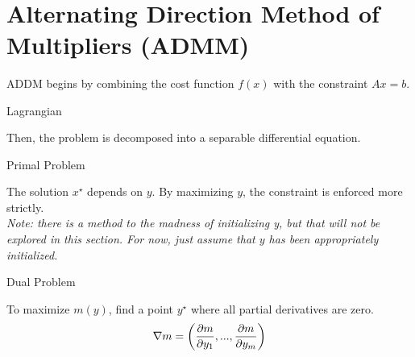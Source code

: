 \documentclass{article}
\begin{document}
\vpush
{}
\\
\section{Alternating Direction Method of Multipliers (ADMM)}
ADDM begins by combining the cost function $f(x)$ with the constraint $Ax=b$.
\begin{headered_box}{Lagrangian}
\end{headered_box}
Then, the problem is decomposed into a separable differential equation.
\begin{headered_box}{Primal Problem}
\end{headered_box}
\begin{flushleft}
  The solution $x^\star$ depends on $y$.  By maximizing $y$, the constraint is enforced more strictly.
  \\
  \vspace{3mm}
  \textit{Note: there is a method to the madness of initializing y, but that will
    not be explored in this section.  For now, just assume that $y$ has been
    appropriately initialized.}
\end{flushleft}

\begin{headered_box}{Dual Problem}
\end{headered_box}
To maximize $m(y)$, find a point $y^\star$ where all partial derivatives are zero.
\begin{align}
  \nabla m=\left({\partial m\over \partial y_1},...,{\partial m\over \partial y_m}\right)
\end{align}
\end{document}
